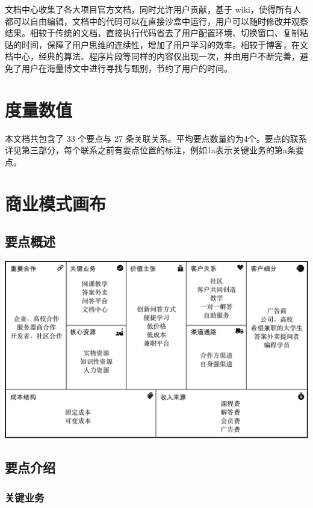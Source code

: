 \documentclass[a4paper]{ctexart}
\begin{document}
文档中心收集了各大项目官方文档，同时允许用户贡献，基于 wiki，使得所有人都可以自由编辑，文档中的代码可以在直接沙盒中运行，用户可以随时修改并观察结果。相较于传统的文档，直接执行代码省去了用户配置环境、切换窗口、复制粘贴的时间，保障了用户思维的连续性，增加了用户学习的效率。相较于博客，在文档中心，经典的算法、程序片段等同样的内容仅出现一次，并由用户不断完善，避免了用户在海量博文中进行寻找与甄别，节约了用户的时间。

\section{度量数值}

本文档共包含了 33 个要点与 27 条关联关系。平均要点数量约为4个。要点的联系详见第三部分，每个联系之前有要点位置的标注，例如1a表示关键业务的第a条要点。

\section{商业模式画布}

\subsection{要点概述}

\begin{center}
  \includegraphics[width=16cm]{canvas}
\end{center}

\subsection{要点介绍}

\subsubsection{关键业务}
\end{document}
